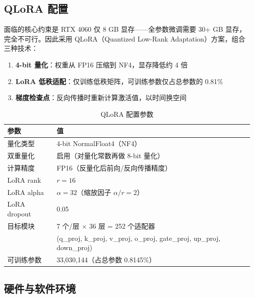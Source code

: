 \documentclass[12pt,a4paper]{ctexart}
\begin{document}
\subsection{QLoRA 配置}

面临的核心约束是 RTX 4060 仅 8 GB 显存——全参数微调需要 30+ GB 显存，完全不可行。因此采用 QLoRA（Quantized Low-Rank Adaptation）方案，组合三种技术：

\begin{enumerate}[nosep]
    \item \textbf{4-bit 量化}：权重从 FP16 压缩到 NF4，显存降低约 4 倍
    \item \textbf{LoRA 低秩适配}：仅训练低秩矩阵，可训练参数仅占总参数的 0.81\%
    \item \textbf{梯度检查点}：反向传播时重新计算激活值，以时间换空间
\end{enumerate}

\begin{table}[htbp]\centering
\caption{QLoRA 配置参数}
\begin{tabular}{@{}ll@{}}
\toprule
\textbf{参数} & \textbf{值} \\
\midrule
量化类型   & 4-bit NormalFloat4（NF4）\\
双重量化   & 启用（对量化常数再做 8-bit 量化）\\
计算精度   & FP16（反量化后前向/反向传播精度）\\
LoRA rank  & $r = 16$ \\
LoRA alpha & $\alpha = 32$（缩放因子 $\alpha/r = 2$）\\
LoRA dropout & 0.05 \\
目标模块   & 7 个/层 $\times$ 36 层 = 252 个适配器 \\
          & (q\_proj, k\_proj, v\_proj, o\_proj, gate\_proj, up\_proj, down\_proj) \\
可训练参数 & 33,030,144（占总参数 0.8145\%）\\
\bottomrule
\end{tabular}
\end{table}

\subsection{硬件与软件环境}
\end{document}
